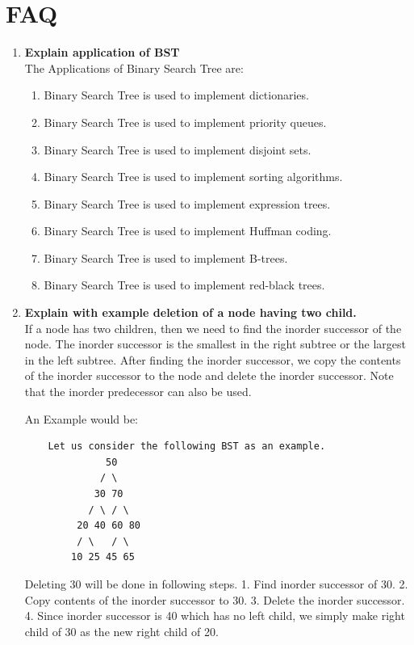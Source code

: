 \documentclass[11pt]{article}
\begin{document}
\section{FAQ}
\begin{enumerate}
\item \textbf{Explain application of BST}\\

The Applications of Binary Search Tree are:
\begin{enumerate}
	\item Binary Search Tree is used to implement dictionaries.
	\item Binary Search Tree is used to implement priority queues.
	\item Binary Search Tree is used to implement disjoint sets.
	\item Binary Search Tree is used to implement sorting algorithms.
	\item Binary Search Tree is used to implement expression trees.
	\item Binary Search Tree is used to implement Huffman coding.
	\item Binary Search Tree is used to implement B-trees.
	\item Binary Search Tree is used to implement red-black trees.
\end{enumerate}
\item \textbf{Explain with example deletion of a node having two child.}\\

If a node has two children, then we need to find the inorder successor of the node. The inorder successor is the smallest in the right subtree or the largest in the left subtree. After finding the inorder successor, we copy the contents of the inorder successor to the node and delete the inorder successor. Note that the inorder predecessor can also be used.

An Example would be:
\begin{verbatim}
    Let us consider the following BST as an example.
              50
             / \
            30 70
           / \ / \
         20 40 60 80
		 / \   / \
		10 25 45 65
\end{verbatim}

Deleting 30 will be done in following steps.
1. Find inorder successor of 30.
2. Copy contents of the inorder successor to 30.
3. Delete the inorder successor.
4. Since inorder successor is 40 which has no left child, we simply make right child of 30 as the new right child of 20.


\end{enumerate}
\end{document}
